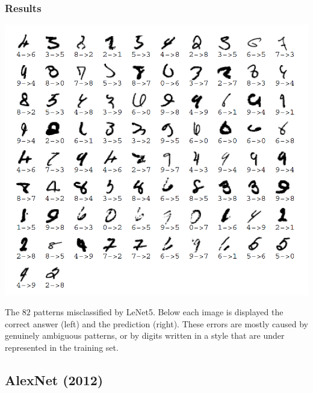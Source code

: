 \begin{frame}
	\frametitle{Results}
	
	\begin{center}
		\includegraphics[scale=0.5]{figs/Lenet_misclassified_digits}
	\end{center}

{\small The $82$ patterns misclassified by LeNet5. Below each image is displayed the correct answer (left) and the prediction (right). These errors are mostly caused by genuinely ambiguous patterns, or by digits written in a style that are under represented in the training set.} 
\end{frame}











\subsection{AlexNet (2012)}

